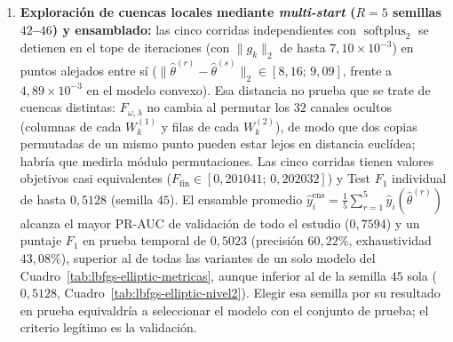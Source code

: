 \documentclass[a4paper,openany,oneside,10pt]{report}
\theoremstyle{pnlTeorema}
\theoremstyle{pnlDefinicion}
\theoremstyle{pnlObservacion}
\begin{document}
\begin{enumerate}
\item \textbf{Exploración de cuencas locales mediante \emph{multi-start} ($R=5$ semillas $42$--$46$) y ensamblado:} las cinco corridas independientes con $\operatorname{softplus}_2$ se detienen en el tope de iteraciones (con $\|g_k\|_2$ de hasta $7{,}10\times 10^{-3}$) en puntos alejados entre sí ($\|\hat\theta^{(r)}-\hat\theta^{(s)}\|_2\in[8{,}16;\,9{,}09]$, frente a $4{,}89\times 10^{-3}$ en el modelo convexo). Esa distancia no prueba que se trate de cuencas distintas: $F_{\omega,\lambda}$ no cambia al permutar los $32$ canales ocultos (columnas de cada $W_k^{(1)}$ y filas de cada $W_k^{(2)}$), de modo que dos copias permutadas de un mismo punto pueden estar lejos en distancia euclídea; habría que medirla módulo permutaciones. Las cinco corridas tienen valores objetivos casi equivalentes ($F_{\mathrm{fin}}\in[0{,}201041;\,0{,}202032]$) y Test $F_1$ individual de hasta $0{,}5128$ (semilla $45$). El ensamble promedio $\hat y_i^{\mathrm{ens}}=\frac15\sum_{r=1}^5 \hat y_i(\hat\theta^{(r)})$ alcanza el mayor PR-AUC de validación de todo el estudio ($0{,}7594$) y un puntaje $F_1$ en prueba temporal de $0{,}5023$ (precisión $60{,}22$\%, exhaustividad $43{,}08$\%), superior al de todas las variantes de un solo modelo del Cuadro~\ref{tab:lbfgs-elliptic-metricas}, aunque inferior al de la semilla $45$ sola ($0{,}5128$, Cuadro~\ref{tab:lbfgs-elliptic-nivel2}). Elegir esa semilla por su resultado en prueba equivaldría a seleccionar el modelo con el conjunto de prueba; el criterio legítimo es la validación.
\end{enumerate}
\end{document}
